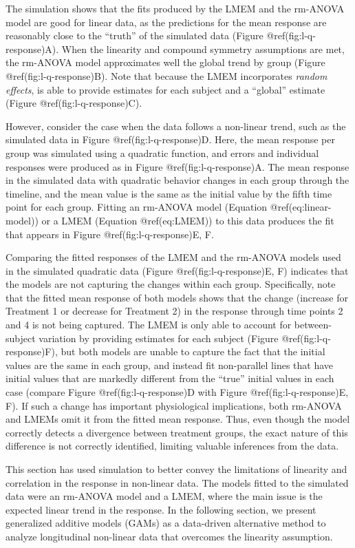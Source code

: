 \documentclass[Royal,times,sagev]{sagej}
\begin{document}
The simulation shows that the fits produced by the LMEM and the rm-ANOVA
model are good for linear data, as the predictions for the mean response
are reasonably close to the ``truth'' of the simulated data (Figure
@ref(fig:l-q-response)A). When the linearity and compound symmetry
assumptions are met, the rm-ANOVA model approximates well the global
trend by group (Figure @ref(fig:l-q-response)B). Note that because the
LMEM incorporates \emph{random effects}, is able to provide estimates
for each subject and a ``global'' estimate (Figure
@ref(fig:l-q-response)C).

However, consider the case when the data follows a non-linear trend,
such as the simulated data in Figure @ref(fig:l-q-response)D. Here, the
mean response per group was simulated using a quadratic function, and
errors and individual responses were produced as in Figure
@ref(fig:l-q-response)A. The mean response in the simulated data with
quadratic behavior changes in each group through the timeline, and the
mean value is the same as the initial value by the fifth time point for
each group. Fitting an rm-ANOVA model (Equation @ref(eq:linear-model))
or a LMEM (Equation @ref(eq:LMEM)) to this data produces the fit that
appears in Figure @ref(fig:l-q-response)E, F.

Comparing the fitted responses of the LMEM and the rm-ANOVA models used
in the simulated quadratic data (Figure @ref(fig:l-q-response)E, F)
indicates that the models are not capturing the changes within each
group. Specifically, note that the fitted mean response of both models
shows that the change (increase for Treatment 1 or decrease for
Treatment 2) in the response through time points 2 and 4 is not being
captured. The LMEM is only able to account for between-subject variation
by providing estimates for each subject (Figure
@ref(fig:l-q-response)F), but both models are unable to capture the fact
that the initial values are the same in each group, and instead fit
non-parallel lines that have initial values that are markedly different
from the ``true'' initial values in each case (compare Figure
@ref(fig:l-q-response)D with Figure @ref(fig:l-q-response)E, F). If such
a change has important physiological implications, both rm-ANOVA and
LMEMs omit it from the fitted mean response. Thus, even though the model
correctly detects a divergence between treatment groups, the exact
nature of this difference is not correctly identified, limiting valuable
inferences from the data.

This section has used simulation to better convey the limitations of
linearity and correlation in the response in non-linear data. The models
fitted to the simulated data were an rm-ANOVA model and a LMEM, where
the main issue is the expected linear trend in the response. In the
following section, we present generalized additive models (GAMs) as a
data-driven alternative method to analyze longitudinal non-linear data
that overcomes the linearity assumption.
\end{document}
